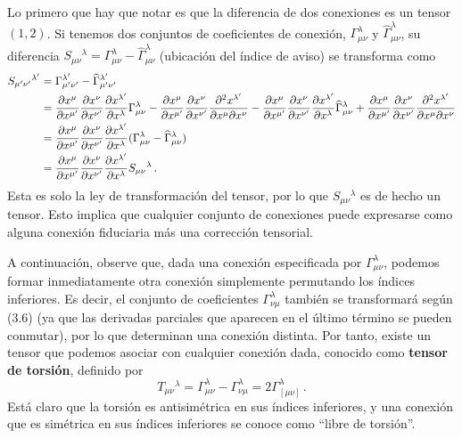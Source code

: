 \documentclass[11pt,b5paper,openany,twoside]{book}
\newcommand{\mn}{{\mu\nu}}
\begin{document}
Lo primero que hay que notar es que la diferencia de dos conexiones es un tensor $(1,2)$.
Si tenemos dos conjuntos de coeficientes de conexión, $\Gamma^\lambda_\mn$ y $\widehat\Gamma^\lambda_\mn$, su diferencia $S_{\mn}{}^\lambda = \Gamma^\lambda_\mn-\widehat\Gamma^\lambda_\mn$ (ubicación del índice de aviso) se transforma como
\begin{align}
S_{\mu'\nu'}{}^{\lambda'} &=  \Gamma^{\lambda'}_{\mu'\nu'}
-\widehat\Gamma^{\lambda'}_{\mu'\nu'} \notag \\
&= {{\partial x^\mu}\over{\partial x^{\mu'}}}
{{\partial x^\nu}\over{\partial x^{\nu'}}}
{{\partial x^{\lambda'}}\over{\partial x^{\lambda}}}
\Gamma^\lambda_{\mu\nu} - {{\partial x^\mu}\over{\partial x^{\mu'}}}
{{\partial x^\nu}\over{\partial x^{\nu'}}}
{{\partial^2 x^{\lambda'}}\over{\partial x^{\mu}\partial x^{\nu}}}
- {{\partial x^\mu}\over{\partial x^{\mu'}}}
{{\partial x^\nu}\over{\partial x^{\nu'}}}
{{\partial x^{\lambda'}}\over{\partial x^{\lambda}}}
\widehat\Gamma^\lambda_{\mu\nu}
+ {{\partial x^\mu}\over{\partial x^{\mu'}}}
{{\partial x^\nu}\over{\partial x^{\nu'}}}
{{\partial^2 x^{\lambda'}}\over{\partial x^{\mu}\partial x^{\nu}}} \notag \\
&=  {{\partial x^\mu}\over{\partial x^{\mu'}}}
{{\partial x^\nu}\over{\partial x^{\nu'}}}
{{\partial x^{\lambda'}}\over{\partial x^{\lambda}}}
(\Gamma^\lambda_{\mu\nu}-\widehat\Gamma^\lambda_{\mu\nu}) \notag \\
&=  {{\partial x^\mu}\over{\partial x^{\mu'}}}
{{\partial x^\nu}\over{\partial x^{\nu'}}}
{{\partial x^{\lambda'}}\over{\partial x^{\lambda}}}
S_{\mu\nu}{}^{\lambda}\,. \label{3.15}
\end{align}
Esta es solo la ley de transformación del tensor, por lo que $S_{\mn}{}^\lambda$ es de hecho un tensor.
Esto implica que cualquier conjunto de conexiones puede expresarse como alguna conexión fiduciaria más una corrección tensorial.

A continuación, observe que, dada una conexión especificada por $\Gamma^\lambda_\mn$, podemos formar inmediatamente otra conexión simplemente permutando los índices inferiores.
Es decir, el conjunto de coeficientes $\Gamma^\lambda_{\nu\mu}$ también se transformará según (3.6) (ya que las derivadas parciales que aparecen en el último término se pueden conmutar), por lo que determinan una conexión distinta.
Por tanto, existe un tensor que podemos asociar con cualquier conexión dada, conocido como {\bf tensor de torsión}, definido por
\begin{equation}
T_{\mu\nu}{}^{\lambda} = \Gamma^\lambda_\mn - \Gamma^\lambda_{\nu\mu}
= 2\Gamma^\lambda_{[\mu\nu]}\,.\label{3.16}
\end{equation}
Está claro que la torsión es antisimétrica en sus índices inferiores, y una conexión que es simétrica en sus índices inferiores se conoce como ``libre de torsión''.
\end{document}
